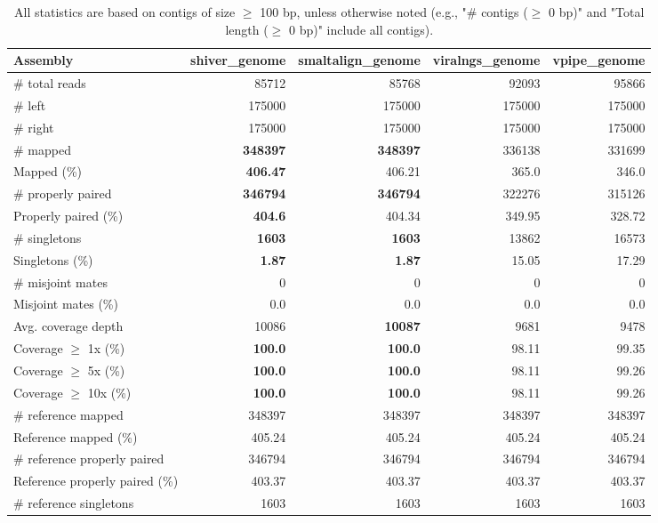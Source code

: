 \documentclass[12pt,a4paper]{article}
\begin{document}
\begin{table}[ht]
\begin{center}
\caption{All statistics are based on contigs of size $\geq$ 100 bp, unless otherwise noted (e.g., "\# contigs ($\geq$ 0 bp)" and "Total length ($\geq$ 0 bp)" include all contigs).}
\begin{tabular}{|l*{4}{|r}|}
\hline
Assembly & shiver\_genome & smaltalign\_genome & viralngs\_genome & vpipe\_genome \\ \hline
\# total reads & 85712 & 85768 & 92093 & 95866 \\ \hline
\# left & 175000 & 175000 & 175000 & 175000 \\ \hline
\# right & 175000 & 175000 & 175000 & 175000 \\ \hline
\# mapped & {\bf 348397} & {\bf 348397} & 336138 & 331699 \\ \hline
Mapped (\%) & {\bf 406.47} & 406.21 & 365.0 & 346.0 \\ \hline
\# properly paired & {\bf 346794} & {\bf 346794} & 322276 & 315126 \\ \hline
Properly paired (\%) & {\bf 404.6} & 404.34 & 349.95 & 328.72 \\ \hline
\# singletons & {\bf 1603} & {\bf 1603} & 13862 & 16573 \\ \hline
Singletons (\%) & {\bf 1.87} & {\bf 1.87} & 15.05 & 17.29 \\ \hline
\# misjoint mates & 0 & 0 & 0 & 0 \\ \hline
Misjoint mates (\%) & 0.0 & 0.0 & 0.0 & 0.0 \\ \hline
Avg. coverage depth & 10086 & {\bf 10087} & 9681 & 9478 \\ \hline
Coverage $\geq$ 1x (\%) & {\bf 100.0} & {\bf 100.0} & 98.11 & 99.35 \\ \hline
Coverage $\geq$ 5x (\%) & {\bf 100.0} & {\bf 100.0} & 98.11 & 99.26 \\ \hline
Coverage $\geq$ 10x (\%) & {\bf 100.0} & {\bf 100.0} & 98.11 & 99.26 \\ \hline
\# reference mapped & 348397 & 348397 & 348397 & 348397 \\ \hline
Reference mapped (\%) & 405.24 & 405.24 & 405.24 & 405.24 \\ \hline
\# reference properly paired & 346794 & 346794 & 346794 & 346794 \\ \hline
Reference properly paired (\%) & 403.37 & 403.37 & 403.37 & 403.37 \\ \hline
\# reference singletons & 1603 & 1603 & 1603 & 1603 \\ \hline

\end{tabular}
\end{center}
\end{table}
\end{document}
